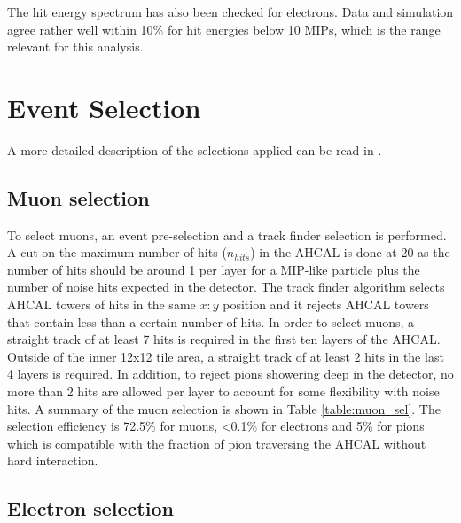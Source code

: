 \documentclass{JINST}
\begin{document}
The hit energy spectrum has also been checked for electrons. Data and simulation agree rather well within 10\% for hit energies below 10 MIPs, which is the range relevant for this analysis.

\section{Event Selection}

A more detailed description of the selections applied can be read in \cite{Brianne:2018rur}.

\subsection{Muon selection}

To select muons, an event pre-selection and a track finder \cite{Hartbrich:2016bbz} selection is performed. A cut on the maximum number of hits ($n_{hits}$) in the AHCAL is done at 20 as the number of hits should be around 1 per layer for a MIP-like particle plus the number of noise hits expected in the detector.
The track finder algorithm selects AHCAL towers of hits in the same $x:y$ position and it rejects AHCAL towers that contain less than a certain number of hits. In order to select muons, a straight track of at least 7 hits is required in the first ten layers of the AHCAL. Outside of the inner 12x12 tile area, a straight track of at least 2 hits in the last 4 layers is required. In addition, to reject pions showering deep in the detector, no more than 2 hits are allowed per layer to account for some flexibility with noise hits. A summary of the muon selection is shown in Table \ref{table:muon_sel}. The selection efficiency is 72.5\% for muons, <0.1\% for electrons and 5\% for pions which is compatible with the fraction of pion traversing the AHCAL without hard interaction.

\subsection{Electron selection}
\end{document}
